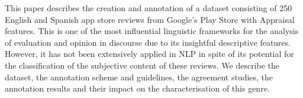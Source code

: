 This paper describes the creation and annotation of a dataset consisting of 250 English and Spanish app store reviews from Google's Play Store with Appraisal features. This is one of the most influential linguistic frameworks for the analysis of evaluation and opinion in discourse due to its insightful descriptive features. However, it has not been extensively applied in NLP in spite of its potential for the classification of the subjective content of these reviews. We describe the dataset, the annotation scheme and guidelines, the agreement studies, the annotation results and their impact on the characterisation of this genre.
